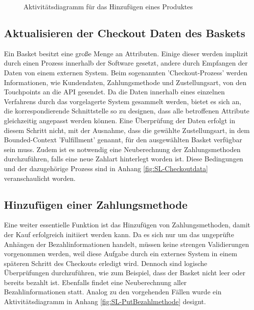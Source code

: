\begin{figure}[h!]
	\centering
	
	\caption{Aktivitätsdiagramm für das Hinzufügen eines Produktes }
	\label{fig:SL-AddProduct}
\end{figure}

\subsection{Aktualisieren der Checkout Daten des Baskets}

Ein Basket besitzt eine große Menge an Attributen. Einige dieser werden implizit durch einen Prozess innerhalb der Software gesetzt, andere durch Empfangen der Daten von einem externen System. Beim sogenannten 'Checkout-Prozess' werden Informationen, wie Kundendaten, Zahlungsmethode und Zustellungsart, von den Touchpoints an die API gesendet. Da die Daten innerhalb eines einzelnen Verfahrens durch das vorgelagerte System gesammelt werden, bietet es sich an, die korrespondierende Schnittstelle so zu designen, dass alle betroffenen Attribute gleichzeitig angepasst werden können. Eine Überprüfung der Daten erfolgt in diesem Schritt nicht, mit der Ausnahme, dass die gewählte Zustellungsart, in dem Bounded-Context 'Fulfillment' genannt, für den ausgewählten Basket verfügbar sein muss. Zudem ist es notwendig eine Neuberechnung der Zahlungsmethoden durchzuführen, falls eine neue Zahlart hinterlegt worden ist. Diese Bedingungen und der dazugehörige Prozess sind in Anhang \ref{fig:SL-Checkoutdata} veranschaulicht worden.


\subsection{Hinzufügen einer Zahlungsmethode}

Eine weiter essentielle Funktion ist das Hinzufügen von Zahlungsmethoden, damit der Kauf erfolgreich initiiert werden kann. Da es sich nur um das ungeprüfte Anhängen der Bezahlinformationen handelt, müssen keine strengen Validierungen vorgenommen werden, weil diese Aufgabe durch ein externes System in einem späteren Schritt des Checkouts erledigt wird. Dennoch sind logische Überprüfungen durchzuführen, wie zum Beispiel, dass der Basket nicht leer oder bereits bezahlt ist. Ebenfalls findet eine Neuberechnung aller Bezahlinformationen statt. Analog zu den vorgehenden Fällen wurde ein Aktivitätsdiagramm in Anhang \ref{fig:SL-PutBezahlmethode} designt.

